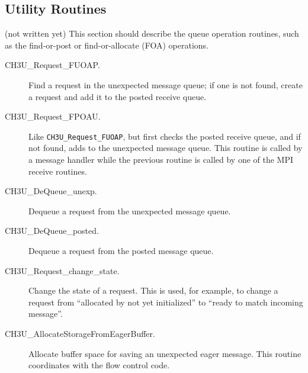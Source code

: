 \documentclass{article}
\def\code{\begingroup\makeustext\eatcode}
\def\eatcode#1{\texttt{#1}\endgroup}
\begin{document}










\subsection{Utility Routines}
(not written yet)
This section should describe the queue operation routines, such as the
find-or-post or find-or-allocate (FOA) operations.



\begin{description}
\item[CH3U\_Request\_FUOAP.]Find a request in the unexpected message
queue; if one is 
not found, create a request and add it to the posted receive queue.
\item[CH3U\_Request\_FPOAU.]Like \code{CH3U\_Request\_FUOAP},
but first checks the posted receive queue, and if not found, adds to
the unexpected message queue.  This routine is called by a message
handler while the previous routine is called by one of the MPI receive
routines.  
\item[CH3U\_DeQueue\_unexp.]Dequeue a request from the unexpected
message queue.
\item[CH3U\_DeQueue\_posted.]Dequeue a request from the posted message
queue. 
\item[CH3U\_Request\_change\_state.]Change the state of a request.
This is used, for example, to change a request from ``allocated by not
yet initialized'' to ``ready to match incoming message''.
\item[CH3U\_AllocateStorageFromEagerBuffer.]Allocate buffer space for
saving an unexpected eager message.  This routine coordinates with the
flow control code.
\end{description}
\end{document}
